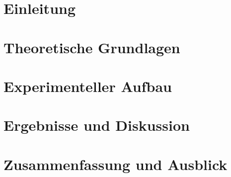 \chapter{Einleitung}\label{kap:einleitung}

\chapter{Theoretische Grundlagen}\label{kap:theoretische_grundlagen}

\chapter{Experimenteller Aufbau}\label{kap:experimenteller_aufbau}

\chapter{Ergebnisse und Diskussion}

\chapter{Zusammenfassung und Ausblick}

%
%
%